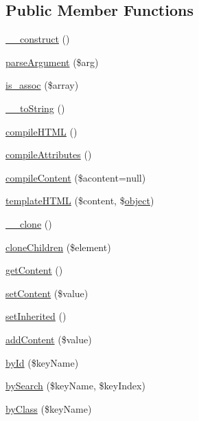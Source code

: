 \subsection*{Public Member Functions}
\begin{DoxyCompactItemize}
\item 
\hyperlink{classhtmlElement_a925a2a3ac520421cc180f391922595af}{\+\_\+\+\_\+construct} ()
\item 
\hyperlink{classhtmlElement_ac36b3e96ac37cad8e499b6dd9dad4511}{parse\+Argument} (\$arg)
\item 
\hyperlink{classhtmlElement_a26a8e3284834135dec7b0e01e84b0877}{is\+\_\+assoc} (\$array)
\item 
\hyperlink{classhtmlElement_a1ad02d4640ea217cafe77a53d8b916f0}{\+\_\+\+\_\+to\+String} ()
\item 
\hyperlink{classhtmlElement_ab45087063ba3e42851d01bd87681475b}{compile\+H\+T\+M\+L} ()
\item 
\hyperlink{classhtmlElement_a4e30cd7e3e6d8ad503766d056490c1ef}{compile\+Attributes} ()
\item 
\hyperlink{classhtmlElement_ac05144459b3739d692738dc947f6989c}{compile\+Content} (\$acontent=null)
\item 
\hyperlink{classhtmlElement_af70cbe9883bbe35f9a2573711625cfc4}{template\+H\+T\+M\+L} (\$content, \$\hyperlink{Shape_8php_a774642dc290de09e3aff55c8b594113f}{object})
\item 
\hyperlink{classhtmlElement_aa52ba0af61d736d37927be6894660cd0}{\+\_\+\+\_\+clone} ()
\item 
\hyperlink{classhtmlElement_a89bb434be414cb5e8422141adf272432}{clone\+Children} (\$element)
\item 
\hyperlink{classhtmlElement_ab74714929671cc7cf3271404a621f4ae}{get\+Content} ()
\item 
\hyperlink{classhtmlElement_abf6e0bb5133c6b654e38cb6a78dc91a8}{set\+Content} (\$value)
\item 
\hyperlink{classhtmlElement_ade31cfc5c7d655a21183e18bd0ea492f}{set\+Inherited} ()
\item 
\hyperlink{classhtmlElement_a063bcf0695c98e25ff2b7fa9ef3c88bf}{add\+Content} (\$value)
\item 
\hyperlink{classhtmlElement_a231a77af8cc0ecb36a0714a8888c278f}{by\+Id} (\$key\+Name)
\item 
\hyperlink{classhtmlElement_a8cc57a9db714d6f615bb169424ba505c}{by\+Search} (\$key\+Name, \$key\+Index)
\item 
\hyperlink{classhtmlElement_aae8d6a0e00314fdd72301557161b4054}{by\+Class} (\$key\+Name)

\end{DoxyCompactItemize}
